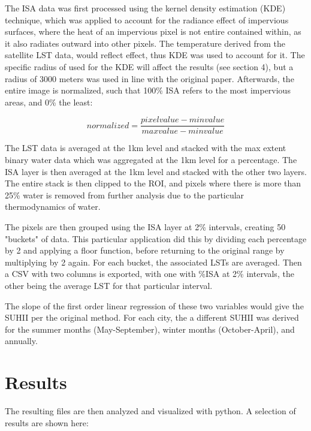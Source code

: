 \documentclass{article}
\begin{document}
 The ISA data was first processed using the kernel density estimation (KDE) technique, which was applied to account for the radiance effect of impervious surfaces, where the heat of an impervious pixel is not entire contained within, as it also radiates outward into other pixels. The temperature derived from the satellite LST data, would reflect effect, thus KDE was used to account for it. The specific radius of used for the KDE will affect the results (see section 4), but a radius of 3000 meters was used in line with the original paper. Afterwards, the entire image is normalized, such that 100\% ISA refers to the most impervious areas, and 0\% the least:
 
 \[normalized = \frac{pixelvalue - minvalue}{maxvalue - minvalue}\]

The LST data is averaged at the 1km level and stacked with the max extent binary water data which was aggregated at the 1km level for a percentage. The ISA layer is then averaged at the 1km level and stacked with the other two layers. The entire stack is then clipped to the ROI, and pixels where there is more than 25\% water is removed from further analysis due to the particular thermodynamics of water.

The pixels are then grouped using the ISA layer at 2\% intervals, creating 50 "buckets" of data. This particular application did this by dividing each percentage by 2 and applying a floor function, before returning to the original range by multiplying by 2 again. For each bucket, the associated LSTs are averaged. Then a CSV with two columns is exported, with one with \%ISA at 2\% intervals, the other being the average LST for that particular interval.

The slope of the first order linear regression of these two variables would give the SUHII per the original method. For each city, the a different SUHII was derived for the summer months (May-September), winter months (October-April), and annually.

\section{Results}
The resulting files are then analyzed and visualized with python. A selection of results are shown here: 
\end{document}
